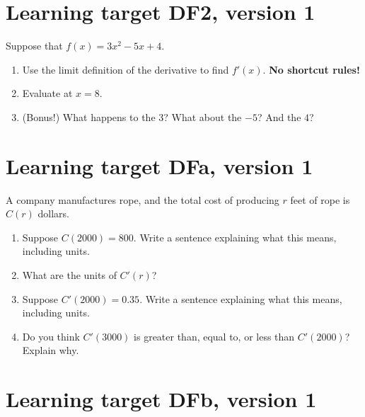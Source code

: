 \pagebreak

\section{Learning target DF2, version 1}

Suppose that $f(x) = 3x^2 - 5x + 4$.
\begin{enumerate}[leftmargin=0pt]
    \item Use the limit definition of the derivative to find $f'(x)$. \textbf{No shortcut rules!}
    
    \vfill
    \vfill

    \item Evaluate at $x=8$.

    \vfill
    \item (Bonus!) What happens to the 3? What about the $-5$? And the $4$?
\end{enumerate}

\pagebreak

\section{Learning target DFa, version 1}

A company manufactures rope, and the total cost of producing $r$ feet of rope is $C(r)$ dollars.
\begin{enumerate}[leftmargin=0pt]
    \item Suppose $C(2000) = 800$. Write a sentence explaining what this means, including units.
    \vfill
    \item What are the units of $C'(r)$?
    \vfill
    \item Suppose $C'(2000) = 0.35$. Write a sentence explaining what this means, including units.
    \vfill
    \item Do you think $C'(3000)$ is greater than, equal to, or less than $C'(2000)$? Explain why.
    \vfill
\end{enumerate}

\pagebreak

\section{Learning target DFb, version 1}

